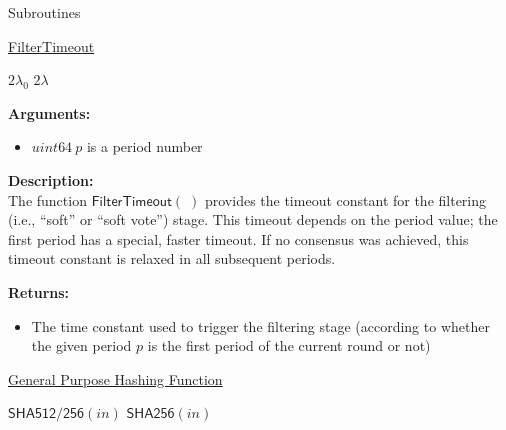 \documentclass[10pt,a4paper]{article}
\begin{document}
\begin{section}{Subroutines}\label{sect:soubroutines}


\begin{algorithm}[H]
    \caption{\underline{FilterTimeout}}
    \label{algo:filter-timeout}
    \begin{algorithmic}[1]
            \Return $2\lambda_0$
        \Else 
            \Return $2\lambda$
        \EndIf
    \EndFunction
    \end{algorithmic}
\end{algorithm}

\noindent \textbf{Arguments:}
\begin{itemize}
    \item $uint64 \ p$ is a period number
  \end{itemize}

\noindent \textbf{Description:}\\
The function $\mathsf{FilterTimeout}(\;)$ provides the timeout 
constant for the filtering (i.e., ``soft'' or ``soft vote'') stage.
This timeout depends on the period value; the first period has a special, faster timeout.
If no consensus was achieved, this timeout constant is relaxed in all subsequent periods. 

\noindent \textbf{Returns:}
\begin{itemize}
    \item The time constant used to trigger the filtering stage (according to whether the given
    period $p$ is the first period of the current round or not)
  \end{itemize}


\begin{algorithm}[H]
    \caption{\underline{General Purpose Hashing Function}}
    \begin{algorithmic}[1]
            \Return $\mathsf{SHA512/256}(in)$
        \Else
            \Return $\mathsf{SHA256}(in)$
        \EndIf
    \EndFunction
    \end{algorithmic}
\end{algorithm}


\end{section}
\end{document}
